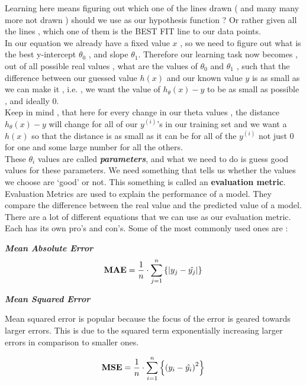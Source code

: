 Learning here means figuring out which one of the lines drawn ( and many many
more not drawn ) should we use as our hypothesis function ? Or rather given all
the lines , which one of them is the BEST FIT line to our data points.\\

In our equation we already have a fixed value \( x \) , so we need to figure out
what is the best y-intercept \( \theta_0 \) , and slope \( \theta_1 \).
Therefore our learning task now becomes , out of all possible real values , what
are the values of \( \theta_0 \) and \( \theta_1 \) , such that the difference
between our guessed value \( h(x) \) and our known value \( y \) is as small as
we can make it , i.e. , we want the value of \( h_{\theta}(x) - y \) to be as
small as possible , and ideally 0.\\

Keep in mind , that here for every change in our theta values , the distance 
\( h_{\theta}(x) - y \) will change for all of our \( y^{(i)} \)'s in our
training set and we want a \( h(x) \) so that the distance is as small as it can
be for all of the \( y^{(i)} \) not just 0 for one and some large number for all
the others.\\

These \( \theta_{i} \) values are called \textbf{\textit{parameters}}, and what
we need to do is guess good values for these parameters. We need something that
tells us whether the values we choose are `good' or not. This something is
called an \textbf{evaluation metric}. Evaluation Metrics are used to explain
the performance of a model. They compare the difference between the real value
and the predicted value of a model. There are a lot of different equations that
we can use as our evaluation metric. Each has its own pro's and con's. Some of
the most commonly used ones are : 

\textbf{\textit{Mean Absolute Error}}
\[
\text{} \\
\textbf{MAE} =
	\frac{1}{n}
	\cdot \sum_{j=1}^{n}
	\left\{
		| y_j - \hat{y_j} |
	\right\}
	\\
\]

\textbf{\textit{Mean Squared Error}}

Mean squared error is popular because the focus of the error is geared towards
larger errors. This is due to the squared term exponentially increasing larger
errors in comparison to smaller ones.

\[
\textbf{MSE} = 
	\frac{1}{n}
	\cdot \sum_{i=1}^{n}
	\left\{
		\left(
			y_i - \hat{y_i}
		\right)^2
	\right\}
	\\
\]

